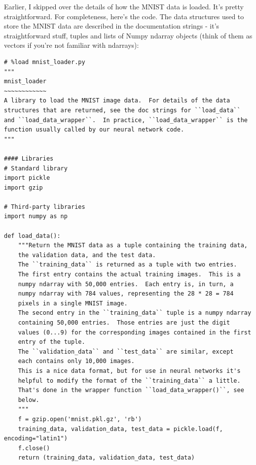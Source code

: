 Earlier, I skipped over the details of how the MNIST data is loaded. It's pretty straightforward. For completeness, here's the code. The data structures used to store the MNIST data are described in the documentation strings - it's straightforward stuff, tuples and lists of Numpy ndarray objects (think of them as vectors if you're not familiar with ndarrays):

\begin{lstlisting}
# %load mnist_loader.py
"""
mnist_loader
~~~~~~~~~~~~
A library to load the MNIST image data.  For details of the data
structures that are returned, see the doc strings for ``load_data``
and ``load_data_wrapper``.  In practice, ``load_data_wrapper`` is the
function usually called by our neural network code.
"""

#### Libraries
# Standard library
import pickle
import gzip

# Third-party libraries
import numpy as np

def load_data():
    """Return the MNIST data as a tuple containing the training data,
    the validation data, and the test data.
    The ``training_data`` is returned as a tuple with two entries.
    The first entry contains the actual training images.  This is a
    numpy ndarray with 50,000 entries.  Each entry is, in turn, a
    numpy ndarray with 784 values, representing the 28 * 28 = 784
    pixels in a single MNIST image.
    The second entry in the ``training_data`` tuple is a numpy ndarray
    containing 50,000 entries.  Those entries are just the digit
    values (0...9) for the corresponding images contained in the first
    entry of the tuple.
    The ``validation_data`` and ``test_data`` are similar, except
    each contains only 10,000 images.
    This is a nice data format, but for use in neural networks it's
    helpful to modify the format of the ``training_data`` a little.
    That's done in the wrapper function ``load_data_wrapper()``, see
    below.
    """
    f = gzip.open('mnist.pkl.gz', 'rb')
    training_data, validation_data, test_data = pickle.load(f, encoding="latin1")
    f.close()
    return (training_data, validation_data, test_data)


\end{lstlisting}
